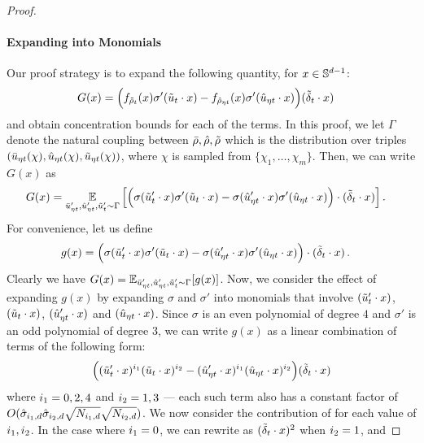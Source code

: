 \begin{proof}
\paragraph{Expanding into Monomials} Our proof strategy is to expand the following quantity, for $x \in \mathbb{S}^{d - 1}$:
\begin{align}
G(x)
& = \Big(f_{{\tilde{\rho}}_t}(x) \sigma'(\tilde{u}_t \cdot x) - f_{{\hat{\rho}}_{\eta t}}(x) \sigma'(\hat{u}_{\eta t} \cdot x) \Big) ({\tilde{\delta}}_t \cdot x)
\end{align}
and obtain concentration bounds for each of the terms. In this proof, we let $\Gamma$ denote the natural coupling between ${\bar{\rho}}, {\hat{\rho}}, {\tilde{\rho}}$ which is the distribution over triples $(\bar{u}_{\eta t}(\chi), \hat{u}_{\eta t}(\chi), \tilde{u}_{\eta t}(\chi))$, where $\chi$ is sampled from $\{\chi_1, \ldots, \chi_m\}$.
Then, we can write $G(x)$ as 
\begin{align}
G(x)
& = \operatorname*{\mathbb{E}}_{\bar{u}_{\eta t}', \hat{u}_{\eta t}', \tilde{u}_t' \sim \Gamma} \Big[ \Big(\sigma(\tilde{u}_t' \cdot x) \sigma'(\tilde{u}_t \cdot x) - \sigma(\hat{u}_{\eta t}' \cdot x) \sigma'(\hat{u}_{\eta t} \cdot x)\Big) \cdot ({\tilde{\delta}}_t \cdot x) \Big] \,.
\end{align}
For convenience, let us define
\begin{align} \label{eq:discrete_time_before_expanding}
g(x)
& = \Big(\sigma(\tilde{u}_t' \cdot x) \sigma'(\tilde{u}_t \cdot x) - \sigma(\hat{u}_{\eta t}' \cdot x) \sigma'(\hat{u}_{\eta t} \cdot x)\Big) \cdot ({\tilde{\delta}}_t \cdot x) \,.
\end{align}
Clearly we have $G(x) = \operatorname*{\mathbb{E}}_{\bar{u}_{\eta t}', \hat{u}_{\eta t}', \tilde{u}_t' \sim \Gamma} [g(x)]$. Now, we consider the effect of expanding $g(x)$ by expanding $\sigma$ and $\sigma'$ into monomials that involve $(\tilde{u}_t' \cdot x)$, $(\tilde{u}_t \cdot x)$, $(\hat{u}_{\eta t}' \cdot x)$ and $(\hat{u}_{\eta t} \cdot x)$. Since $\sigma$ is an even polynomial of degree $4$ and $\sigma'$ is an odd polynomial of degree $3$, we can write $g(x)$ as a linear combination of terms of the following form:
\begin{align} \label{eq:single_term}
\Big((\tilde{u}_t' \cdot x)^{i_{1}} (\tilde{u}_t \cdot x)^{i_{2}} - (\hat{u}_{\eta t}' \cdot x)^{i_{1}} (\hat{u}_{\eta t} \cdot x)^{i_{2}} \Big) ({\tilde{\delta}}_t \cdot x)
\end{align}
where $i_{1} = 0, 2, 4$ and $i_{2} = 1, 3$ --- each such term also has a constant factor of $O(\hat{\sigma}_{i_{1}, d} \hat{\sigma}_{i_{2}, d} \sqrt{N_{i_{1}, d}} \sqrt{N_{i_{2}, d}})$. We now consider the contribution of  for each value of $i_{1}, i_{2}$. In the case where $i_{1} = 0$, we can rewrite  as $({\tilde{\delta}}_t \cdot x)^2$ when $i_{2} = 1$, and

\end{proof}
